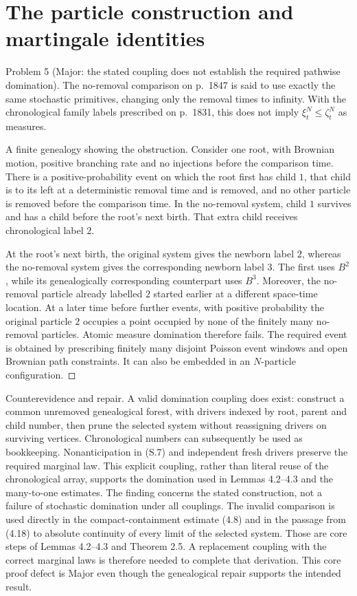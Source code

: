 \documentclass[10pt]{article}
\begin{document}
\section*{The particle construction and martingale identities}
Problem 5 (Major: the stated coupling does not establish the required pathwise domination).  The no-removal comparison on p. 1847 is said to use exactly the same stochastic primitives, changing only the removal times to infinity. With the chronological family labels prescribed on p. 1831, this does not imply \(\xi_t^N\leq\zeta_t^N\) as measures.\par
A finite genealogy showing the obstruction. Consider one root, with Brownian motion, positive branching rate and no injections before the comparison time. There is a positive-probability event on which the root first has child \(1\), that child is to its left at a deterministic removal time and is removed, and no other particle is removed before the comparison time. In the no-removal system, child \(1\) survives and has a child before the root’s next birth. That extra child receives chronological label \(2\).\par
At the root’s next birth, the original system gives the newborn label \(2\), whereas the no-removal system gives the corresponding newborn label \(3\). The first uses \(B^2\), while its genealogically corresponding counterpart uses \(B^3\). Moreover, the no-removal particle already labelled \(2\) started earlier at a different space-time location. At a later time before further events, with positive probability the original particle \(2\) occupies a point occupied by none of the finitely many no-removal particles. Atomic measure domination therefore fails. The required event is obtained by prescribing finitely many disjoint Poisson event windows and open Brownian path constraints. It can also be embedded in an \(N\)-particle configuration. ◻\par
Counterevidence and repair. A valid domination coupling does exist: construct a common unremoved genealogical forest, with drivers indexed by root, parent and child number, then prune the selected system without reassigning drivers on surviving vertices. Chronological numbers can subsequently be used as bookkeeping. Nonanticipation in (S.7) and independent fresh drivers preserve the required marginal law. This explicit coupling, rather than literal reuse of the chronological array, supports the domination used in Lemmas 4.2–4.3 and the many-to-one estimates. The finding concerns the stated construction, not a failure of stochastic domination under all couplings. The invalid comparison is used directly in the compact-containment estimate (4.8) and in the passage from (4.18) to absolute continuity of every limit of the selected system. Those are core steps of Lemmas 4.2–4.3 and Theorem 2.5. A replacement coupling with the correct marginal laws is therefore needed to complete that derivation. This core proof defect is Major even though the genealogical repair supports the intended result.\par
\end{document}
